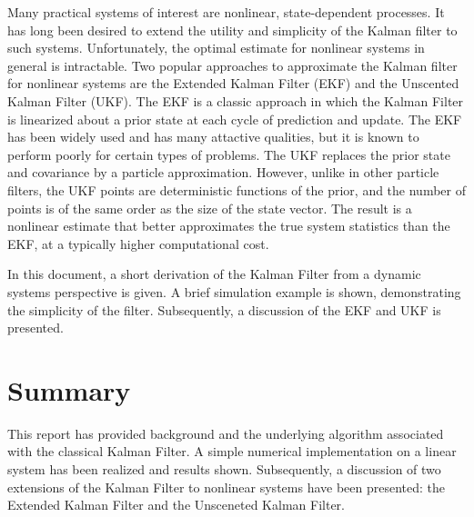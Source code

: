 \documentclass[12pt,draftcls,onecolumn]{IEEEtran}
\begin{document}
Many practical systems of interest are nonlinear, state-dependent processes.
It has long been desired to extend the utility and simplicity of the Kalman filter to such systems.
Unfortunately, the optimal estimate for nonlinear systems in general is intractable\cite{kay1993}.
Two popular approaches to approximate the Kalman filter for nonlinear systems are the Extended Kalman Filter (EKF) and the Unscented Kalman Filter (UKF).
The EKF is a classic approach in which the Kalman Filter is linearized about a prior state at each cycle of prediction and update.
The EKF has been widely used and has many attactive qualities, but it is known to perform poorly for certain types of problems\cite{wan2000}.
The UKF replaces the prior state and covariance by a particle approximation.
However, unlike in other particle filters, the UKF points are deterministic functions of the prior, and the number of points is of the same order as the size of the state vector.
The result is a nonlinear estimate that better approximates the true system statistics than the EKF, at a typically higher computational cost.

In this document, a short derivation of the Kalman Filter from a dynamic systems perspective is given.
A brief simulation example is shown, demonstrating the simplicity of the filter.
Subsequently, a discussion of the EKF and UKF is presented.







\section{Summary}

This report has provided background and the underlying algorithm associated with the classical Kalman Filter.
A simple numerical implementation on a linear system has been realized and results shown.
Subsequently, a discussion of two extensions of the Kalman Filter to nonlinear systems have been presented: the Extended Kalman Filter and the Unsceneted Kalman Filter.

\nocite{kay1993,wan2000,julier1997,woodbury2015,kalman1960,crassidis2011}



\appendix

\end{document}
